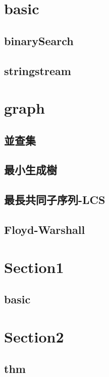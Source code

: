 \section{basic}
    \subsection{binarySearch}
        
    \subsection{stringstream}
        
\section{graph}
    \subsection{並查集}
        
    \subsection{最小生成樹}
        
    \subsection{最長共同子序列-LCS}
        
    \subsection{Floyd-Warshall}
        

\section{Section1}
    \subsection{basic}
        

\section{Section2}
    \subsection{thm}
        